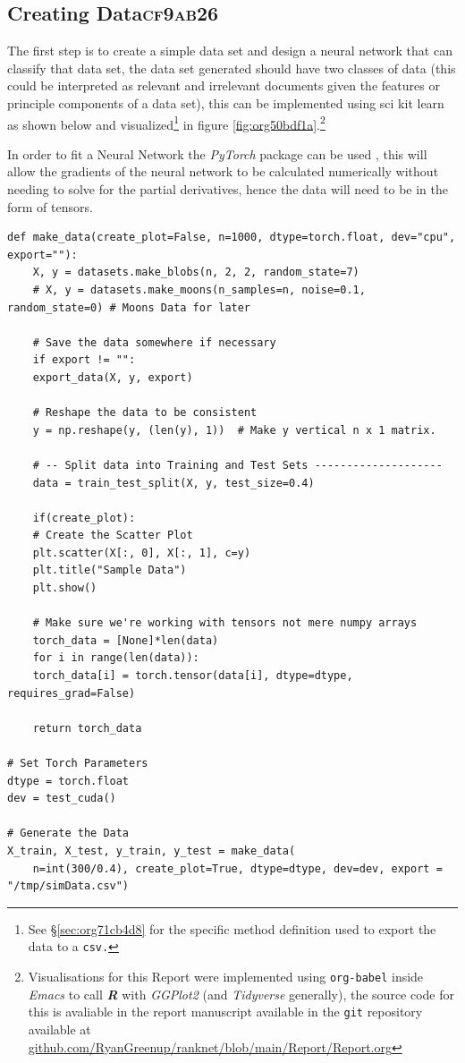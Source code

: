 \documentclass[a4paper,11pt,twoside]{article}
\begin{document}
\subsection{Creating Data\hfill{}\textsc{cf9ab26}}
\label{sec:org9cc67bb}
The first step is to create a simple data set and design a neural
network that can classify that data set, the data set generated
should have two classes of data (this could be interpreted as
relevant and irrelevant documents given the features or principle
components of a data set), this can be implemented using sci kit
learn as shown below and visualized\footnote{See \S \ref{sec:org71cb4d8} for the specific method definition used to
export the data to a \texttt{csv.}} in figure \ref{fig:org50bdf1a}.\footnote{Visualisations for this Report were implemented using
\texttt{org-babel} \cite{dominikOrgModeReference2018} inside \emph{Emacs}
\cite{stallmanGNUEmacsManual2002} to call \textbf{\emph{R}}
\cite{rcoreteamLanguageEnvironmentStatistical2021} with \emph{GGPlot2}
\cite{wickhamGgplot2ElegantGraphics2016a} (and \emph{Tidyverse}
\cite{wickhamWelcomeTidyverse2019} generally), the source code for this
is avaliable in the report manuscript available in the \texttt{git} repository
available at \href{https://github.com/RyanGreenup/ranknet/blob/main/Report/Report.org}{github.com/RyanGreenup/ranknet/blob/main/Report/Report.org}\label{org464a819}}


In order to fit a Neural Network the \emph{PyTorch} package can be used
\cite{NEURIPS2019_9015}, this will allow the gradients of the neural
network to be calculated numerically without needing to solve for
the partial derivatives, hence the data will need to be in the
form of tensors.

\begin{verbatim}
def make_data(create_plot=False, n=1000, dtype=torch.float, dev="cpu", export=""):
    X, y = datasets.make_blobs(n, 2, 2, random_state=7)
    # X, y = datasets.make_moons(n_samples=n, noise=0.1, random_state=0) # Moons Data for later

    # Save the data somewhere if necessary
    if export != "":
	export_data(X, y, export)

    # Reshape the data to be consistent
    y = np.reshape(y, (len(y), 1))  # Make y vertical n x 1 matrix.

    # -- Split data into Training and Test Sets --------------------
    data = train_test_split(X, y, test_size=0.4)

    if(create_plot):
	# Create the Scatter Plot
	plt.scatter(X[:, 0], X[:, 1], c=y)
	plt.title("Sample Data")
	plt.show()

    # Make sure we're working with tensors not mere numpy arrays
    torch_data = [None]*len(data)
    for i in range(len(data)):
	torch_data[i] = torch.tensor(data[i], dtype=dtype, requires_grad=False)

    return torch_data

# Set Torch Parameters
dtype = torch.float
dev = test_cuda()

# Generate the Data
X_train, X_test, y_train, y_test = make_data(
    n=int(300/0.4), create_plot=True, dtype=dtype, dev=dev, export = "/tmp/simData.csv")
\end{verbatim}
\end{document}
